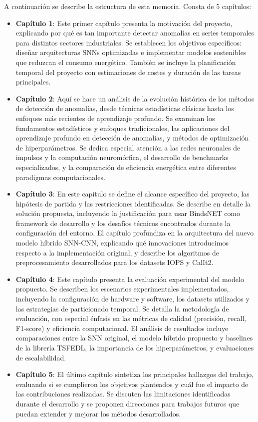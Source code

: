 A continuación se describe la estructura de esta memoria. Consta de 5 capítulos:

\begin{itemize}
    \item\textbf{Capítulo 1}: Este primer capítulo presenta la motivación del proyecto, explicando por qué es tan importante detectar anomalías en series temporales para distintos sectores industriales. Se establecen los objetivos específicos: diseñar arquitecturas SNNs optimizadas e implementar modelos sostenibles que reduzcan el consumo energético. También se incluye la planificación temporal del proyecto con estimaciones de costes y duración de las tareas principales.
    
    \item\textbf{Capítulo 2}: Aquí se hace un análisis de la evolución histórica de los métodos de detección de anomalías, desde técnicas estadísticas clásicas hasta los enfoques más recientes de aprendizaje profundo. Se examinan los fundamentos estadísticos y enfoques tradicionales, las aplicaciones del aprendizaje profundo en detección de anomalías, y métodos de optimización de hiperparámetros. Se dedica especial atención a las redes neuronales de impulsos y la computación neuromórfica, el desarrollo de benchmarks especializados, y la comparación de eficiencia energética entre diferentes paradigmas computacionales.
    
    \item\textbf{Capítulo 3}: En este capítulo se define el alcance específico del proyecto, las hipótesis de partida y las restricciones identificadas. Se describe en detalle la solución propuesta, incluyendo la justificación para usar BindsNET como framework de desarrollo y los desafíos técnicos encontrados durante la configuración del entorno. El capítulo profundiza en la arquitectura del nuevo modelo híbrido SNN-CNN, explicando qué innovaciones introducimos respecto a la implementación original, y describe los algoritmos de preprocesamiento desarrollados para los datasets IOPS y CalIt2.
    
    \item\textbf{Capítulo 4}: Este capítulo presenta la evaluación experimental del modelo propuesto. Se describen los escenarios experimentales implementados, incluyendo la configuración de hardware y software, los datasets utilizados y las estrategias de particionado temporal. Se detalla la metodología de evaluación, con especial énfasis en las métricas de calidad (precisión, recall, F1-score) y eficiencia computacional. El análisis de resultados incluye comparaciones entre la SNN original, el modelo híbrido propuesto y baselines de la librería TSFEDL, la importancia de los hiperparámetros, y evaluaciones de escalabilidad.
    
    \item\textbf{Capítulo 5}: El último capítulo sintetiza los principales hallazgos del trabajo, evaluando si se cumplieron los objetivos planteados y cuál fue el impacto de las contribuciones realizadas. Se discuten las limitaciones identificadas durante el desarrollo y se proponen direcciones para trabajos futuros que puedan extender y mejorar los métodos desarrollados.
\end{itemize}

